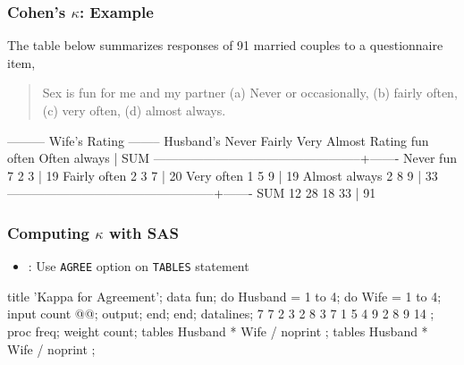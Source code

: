 \begin{frame}[fragile]
  \frametitle{Cohen's $\kappa$: Example}
The table below summarizes responses of 91
married couples to a questionnaire item,

\begin{quote}
Sex is fun for me and my partner (a) Never or occasionally, (b)
fairly often, (c) very often, (d) almost always.  
\end{quote}
\vspace{2em}

\begin{Output}
              --------- Wife's Rating --------
Husband's     Never   Fairly     Very   Almost
Rating          fun    often    Often   always    |   SUM    
--------------------------------------------------+-------
Never fun                 7        2        3    |    19
Fairly often      2                3        7    |    20
Very often        1        5                9    |    19
Almost always     2        8        9           |    33
--------------------------------------------------+-------
SUM              12       28       18       33    |    91    
\end{Output}
\end{frame}

\begin{frame}[fragile]
  \frametitle{Computing $\kappa$ with SAS}
  \begin{itemize}
	\item {}: Use \texttt{AGREE} option on \texttt{TABLES} statement
  \end{itemize}

\vspace{2ex}
\begin{Input}[fontsize=\footnotesize,label=\fbox{\texttt{kappa3.sas}},baselinestretch=0.8]
title 'Kappa for Agreement';
data fun;
   do Husband = 1 to 4;
   do Wife    = 1 to 4;
      input count @@;
      output;
      end; end;
datalines;
 7     7     2      3
 2     8     3      7
 1     5     4      9
 2     8     9     14
;
proc freq;
  weight count;
  tables Husband * Wife / noprint ;      
  tables Husband * Wife / noprint ;
\end{Input}
\end{frame}


